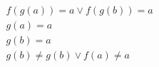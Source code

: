 \begin{align*}
%
& f(g(a)) = a \lor f(g(b)) = a
~\\~
& g(a) = a
~\\~
& g(b) = a
~\\~
& g(b)  \neq  g(b) \lor f(a)  \neq  a
%
\end{align*}
